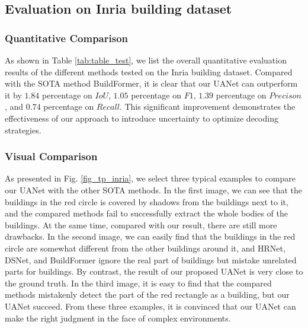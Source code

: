 \documentclass[lettersize,journal]{IEEEtran}
\begin{document}
\subsection{Evaluation on Inria building dataset}
\subsubsection{Quantitative Comparison}
As shown in Table \ref{tab:table_test}, we list the overall quantitative evaluation results of the different methods tested on the Inria building dataset. Compared with the SOTA method BuildFormer, it is clear that our UANet can outperform it by $1.84$ percentage on $IoU$, $1.05$ percentage on $F1$, $1.39$ percentage on $Precison$, and $0.74$ percentage on $Recall$. This significant improvement demonstrates the effectiveness of our approach to introduce uncertainty to optimize decoding strategies.

\begin{figure*}
\centering
{}
\hfil
{}
\hfil
{}
\hfil
{}
\hfil
{}
\hfil
{}
\hfil
{}
\hfil
\caption{Visual Comparison on Inria building dataset.}
\label{fig_tp_inria}
\vspace{-1.0em}
\end{figure*}


\subsubsection{Visual Comparison}
As presented in Fig. \ref{fig_tp_inria}, we select three typical examples to compare our UANet with the other SOTA methods. In the first image, we can see that the buildings in the red circle is covered by shadows from the buildings next to it, and the compared methods fail to successfully extract the whole bodies of the buildings.
At the same time, compared with our result, there are still more drawbacks. In the second image, we can easily find that the buildings in the red circle are somewhat different from the other buildings around it, and HRNet, DSNet, and BuildFormer ignore the real part of buildings but mistake unrelated parts for buildings. By contrast, the result of our proposed UANet is very close to the ground truth. In the third image, it is easy to find that the compared methods mistakenly detect the part of the red rectangle as a building, but our UANet succeed. From these three examples, it is convinced that our UANet can make the right judgment in the face of complex environments.
\end{document}
